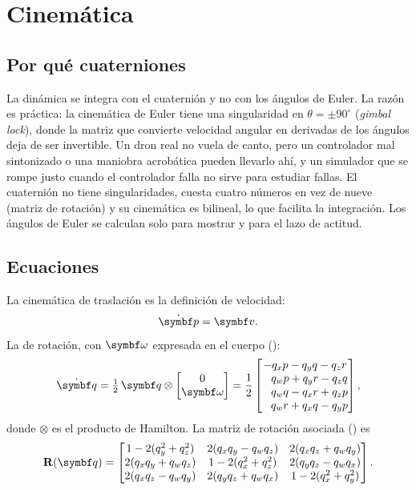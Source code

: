 \section{Cinemática}
\label{sec:cinematica}

\subsection{Por qué cuaterniones}

La dinámica se integra con el cuaternión y no con los ángulos de Euler. La
razón es práctica: la cinemática de Euler tiene una singularidad en
$\theta=\pm90^\circ$ (\emph{gimbal lock}), donde la matriz que convierte
velocidad angular en derivadas de los ángulos deja de ser invertible. Un
dron real no vuela de canto, pero un controlador mal sintonizado o una
maniobra acrobática pueden llevarlo ahí, y un simulador que se rompe
justo cuando el controlador falla no sirve para estudiar fallas. El
cuaternión no tiene singularidades, cuesta cuatro números en vez de nueve
(matriz de rotación) y su cinemática es bilineal, lo que facilita la
integración. Los ángulos de Euler se calculan solo para mostrar y para el
lazo de actitud.

\subsection{Ecuaciones}

La cinemática de traslación es la definición de velocidad:
\begin{equation}
\dot{\vect p} = \vect v .
\label{eq:pdot}
\end{equation}
La de rotación, con $\vect\omega$ expresada en el cuerpo
():
\begin{equation}
\dot{\vect q} = \tfrac12\,\vect q\otimes\begin{bmatrix}0\\ \vect\omega\end{bmatrix}
=\frac12\begin{bmatrix}
-q_x p - q_y q - q_z r\\
\phantom{-}q_w p + q_y r - q_z q\\
\phantom{-}q_w q - q_x r + q_z p\\
\phantom{-}q_w r + q_x q - q_y p
\end{bmatrix},
\label{eq:qdot}
\end{equation}
donde $\otimes$ es el producto de Hamilton. La matriz de rotación asociada
() es
\begin{equation}
\R(\vect q)=\begin{bmatrix}
1-2(q_y^2+q_z^2) & 2(q_xq_y-q_wq_z) & 2(q_xq_z+q_wq_y)\\
2(q_xq_y+q_wq_z) & 1-2(q_x^2+q_z^2) & 2(q_yq_z-q_wq_x)\\
2(q_xq_z-q_wq_y) & 2(q_yq_z+q_wq_x) & 1-2(q_x^2+q_y^2)
\end{bmatrix}.
\label{eq:Rq}
\end{equation}

